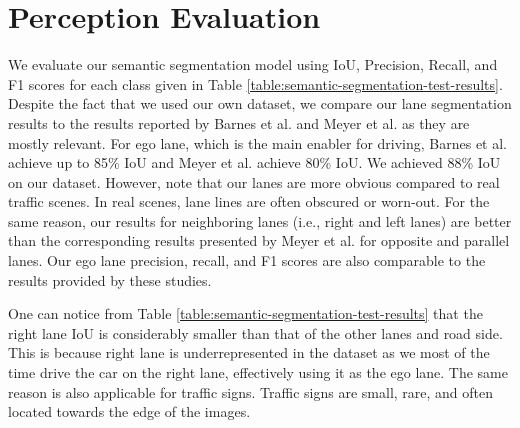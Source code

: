\section{Perception Evaluation}

We evaluate our semantic segmentation model using IoU, Precision, Recall, and
F1 scores for each class given in Table
\ref{table:semantic-segmentation-test-results}. Despite the fact that we used
our own dataset, we compare our lane segmentation results to the results
reported by Barnes et al. \cite{Barnes2016FindYO} and Meyer et al.
\cite{Meyer2018DeepSL} as they are mostly relevant. For ego lane, which is the
main enabler for driving, Barnes et al. \cite{Barnes2016FindYO} achieve up to
85\% IoU and Meyer et al. \cite{Meyer2018DeepSL} achieve 80\% IoU. We achieved
88\% IoU on our dataset. However, note that our lanes are more obvious
compared to real traffic scenes. In real scenes, lane lines are often obscured
or worn-out. For the same reason, our results for neighboring lanes (i.e.,
right and left lanes) are better than the corresponding results presented by
Meyer et al. \cite{Meyer2018DeepSL} for opposite and parallel lanes. Our ego
lane precision, recall, and F1 scores are also comparable to the results
provided by these studies.

One can notice from Table \ref{table:semantic-segmentation-test-results} that
the right lane IoU is considerably smaller than that of the other lanes and
road side. This is because right lane is underrepresented in the dataset as we
most of the time drive the car on the right lane, effectively using it as the
ego lane. The same reason is also applicable for traffic signs. Traffic signs
are small, rare, and often located towards the edge of the images.

